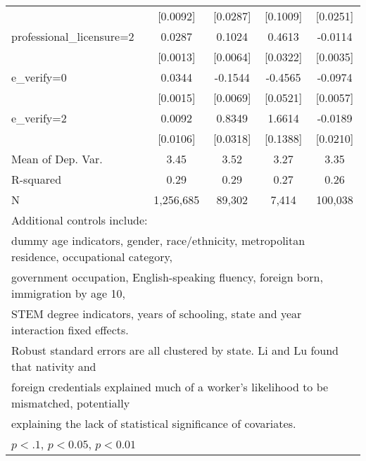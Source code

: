 \begin{table}[htbp]
\begin{tabular}{l*{4}{c}}
                    &    [0.0092]         &    [0.0287]         &    [0.1009]         &    [0.0251]         \\
\addlinespace
professional\_licensure=2&      0.0287\sym{***}&      0.1024\sym{***}&      0.4613\sym{***}&     -0.0114\sym{***}\\
                    &    [0.0013]         &    [0.0064]         &    [0.0322]         &    [0.0035]         \\
\addlinespace
e\_verify=0          &      0.0344\sym{***}&     -0.1544\sym{***}&     -0.4565\sym{***}&     -0.0974\sym{***}\\
                    &    [0.0015]         &    [0.0069]         &    [0.0521]         &    [0.0057]         \\
\addlinespace
e\_verify=2          &      0.0092         &      0.8349\sym{***}&      1.6614\sym{***}&     -0.0189         \\
                    &    [0.0106]         &    [0.0318]         &    [0.1388]         &    [0.0210]         \\
\midrule
Mean of Dep. Var.   &        3.45         &        3.52         &        3.27         &        3.35         \\
R-squared           &        0.29         &        0.29         &        0.27         &        0.26         \\
N                   &   1,256,685         &      89,302         &       7,414         &     100,038         \\
\bottomrule
\multicolumn{5}{l}{\footnotesize Additional controls include:}\\
\multicolumn{5}{l}{\footnotesize dummy age indicators, gender, race/ethnicity, metropolitan residence, occupational category,}\\
\multicolumn{5}{l}{\footnotesize government occupation, English-speaking fluency, foreign born, immigration by age 10,}\\
\multicolumn{5}{l}{\footnotesize STEM degree indicators, years of schooling, state and year interaction fixed effects.}\\
\multicolumn{5}{l}{\footnotesize Robust standard errors are all clustered by state. Li and Lu found that nativity and}\\
\multicolumn{5}{l}{\footnotesize foreign credentials explained much of a worker's likelihood to be mismatched, potentially}\\
\multicolumn{5}{l}{\footnotesize explaining the lack of statistical significance of covariates.}\\
\multicolumn{5}{l}{\footnotesize \sym{*} \(p<.1\), \sym{**} \(p<0.05\), \sym{***} \(p<0.01\)}\\
\end{tabular}
\end{table}
